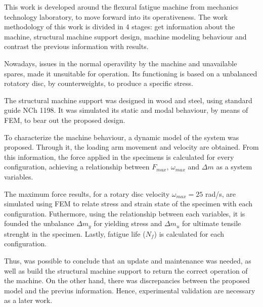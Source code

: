 
This work is developed around the flexural fatigue machine from mechanics technology laboratory, to move forward into its operativeness. The work methodology of this work is divided in 4 stages: get information about the machine, structural machine support design, machine modeling behaviour and contrast the previous information with results.

Nowadays, issues in the normal operavility by the machine and unavailable spares, made it unsuitable for operation. Its functioning is based on a unbalanced rotatory disc, by counterweights, to produce a specific stress.

The structural machine support was designed in wood and steel, using standard guide NCh 1198. It was simulated its static and modal behaviour, by means of FEM, to bear out the proposed design.

To characterize the machine behaviour, a dynamic model of the system was proposed. Through it, the loading arm movement and velocity are obtained. From this information, the force applied in the specimens is calculated for every configuration, achieving a relationship between $F_{max}$, $\omega_{max}$ and $\Delta m$ as a system variables.

The maximum force results, for a rotary disc velocity $\omega_{max}=25$ rad/s, are simulated using FEM to relate stress and strain state of the specimen with each configuration. Futhermore, using the relationship between each variables, it is founded the unbalance $\Delta m_y$ for yielding stress and $\Delta m_u$ for ultimate tensile strenght in the specimen. Lastly, fatigue life ($N_f$) is calculated for each configuration.

Thus, was possible to conclude that an update and maintenance was needed, as well as build the structural machine support to return the correct operation of the machine. On the other hand, there was discrepancies between the proposed model and the previus information. Hence, experimental validation are necessary as a later work.